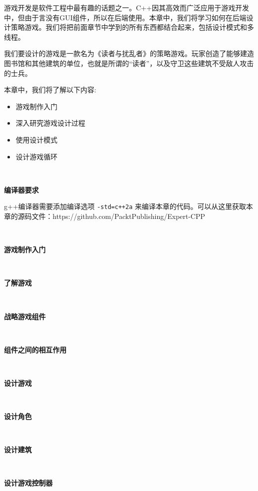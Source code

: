 游戏开发是软件工程中最有趣的话题之一。C++因其高效而广泛应用于游戏开发中，但由于言没有GUI组件，所以在后端使用。本章中，我们将学习如何在后端设计策略游戏。我们将把前面章节中学到的所有东西都结合起来，包括设计模式和多线程。 \par
我们要设计的游戏是一款名为《读者与扰乱者》的策略游戏。玩家创造了能够建造图书馆和其他建筑的单位，也就是所谓的“读者”，以及守卫这些建筑不受敌人攻击的士兵。 \par
本章中，我们将了解以下内容: \par

\begin{itemize}
	\item 游戏制作入门
	\item 深入研究游戏设计过程
	\item 使用设计模式
	\item 设计游戏循环
\end{itemize}

\noindent\textbf{}\ \par
\textbf{编译器要求} \ \par
g++编译器需要添加编译选项 \texttt{-std=c++2a} 来编译本章的代码。可以从这里获取本章的源码文件：https:/​/github.​com/PacktPublishing/Expert-CPP \par

\noindent\textbf{}\ \par
\textbf{游戏制作入门} \ \par

\noindent\textbf{}\ \par
\textbf{了解游戏} \ \par

\noindent\textbf{}\ \par
\textbf{战略游戏组件} \ \par

\noindent\textbf{}\ \par
\textbf{组件之间的相互作用} \ \par

\noindent\textbf{}\ \par
\textbf{设计游戏} \ \par

\noindent\textbf{}\ \par
\textbf{设计角色} \ \par

\noindent\textbf{}\ \par
\textbf{设计建筑} \ \par

\noindent\textbf{}\ \par
\textbf{设计游戏控制器} \ \par

